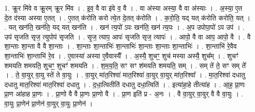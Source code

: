 \documentclass[17pt]{extarticle}
\begin{document}
1. क्रू॒र मि॑वे व क्रू॒रम् क्रू॒र मि॑व । . इ॒व॒ वै वा इ॑वे व॒ वै । . वा अ॑स्या अस्या॒ वै वा अ॑स्याः । . अ॒स्या॒ ए॒त दे॒त द॑स्या अस्या ए॒तत् । . ए॒तत् क॑रोति करो त्ये॒त दे॒तत् क॑रोति । . क॒रो॒ति॒ यद् यत् क॑रोति करोति॒ यत् । . यत् खन॑ति॒ खन॑ति॒ यद् यत् खन॑ति । . खन॑ त्य॒पो॑ ऽपः खन॑ति॒ खन॑ त्य॒पः । . अ॒प उपोपा॒पो॑ ऽप उप॑ । . उप॑ सृजति सृज॒ त्युपोप॑ सृजति । . सृ॒ज॒ त्याप॒ आपः॑ सृजति सृज॒ त्यापः॑ । . आपो॒ वै वा आप॒ आपो॒ वै । . वै शा॒न्ताः शा॒न्ता वै वै शा॒न्ताः । . शा॒न्ताः शा॒न्ताभिः॑ शा॒न्ताभिः॑ शा॒न्ताः शा॒न्ताः शा॒न्ताभिः॑ । . शा॒न्ताभि॑ रे॒वैव शा॒न्ताभिः॑ शा॒न्ताभि॑ रे॒व । . ए॒वास्या॑ अस्या ए॒वैवास्यै᳚ । . अ॒स्यै॒ शुचꣳ॒॒ शुच॑ मस्या अस्यै॒ शुच᳚म् । . शुचꣳ॑ शमयति शमयति॒ शुचꣳ॒॒ शुचꣳ॑ शमयति । . श॒म॒य॒ति॒ सꣳ सꣳ श॑मयति शमयति॒ सम् । . सम् ते॑ ते॒ सꣳ सम् ते᳚ । . ते॒ वा॒युर् वा॒यु स्ते॑ ते वा॒युः । . वा॒युर् मा॑त॒रिश्वा॑ मात॒रिश्वा॑ वा॒युर् वा॒युर् मा॑त॒रिश्वा᳚ । . मा॒त॒रिश्वा॑ दधातु दधातु मात॒रिश्वा॑ मात॒रिश्वा॑ दधातु । . द॒धा॒त्वितीति॑ दधातु दधा॒त्विति॑ । . इत्या॑हा॒हे तीत्या॑ह । . आ॒ह॒ प्रा॒णः प्रा॒ण आ॑हाह प्रा॒णः । . प्रा॒णो वै वै प्रा॒णः प्रा॒णो वै । . प्रा॒ण इति॑ प्र - अ॒नः । . वै वा॒युर् वा॒युर् वै वै वा॒युः । . वा॒युः प्रा॒णेन॑ प्रा॒णेन॑ वा॒युर् वा॒युः प्रा॒णेन॑ । \newline
\end{document}
